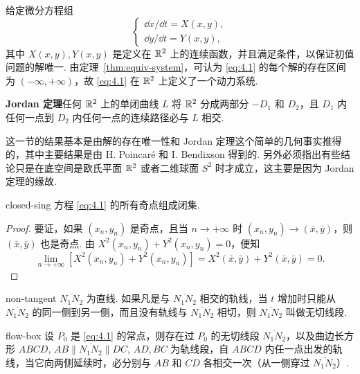 
给定微分方程组
\[
\begin{cases}
\dd x/\dd t = X(x, y), \\
\dd y/\dd t = Y(x, y),
\end{cases} \tag{4.1}\label{eq:4.1}
\]
其中 $X(x, y), Y(x, y)$ 是定义在 $\mathbb{R}^2$ 上的连续函数，并且满足条件，以保证初值问题的解唯一. 由定理~\ref{thm:equiv-system}，可认为 \eqref{eq:4.1} 的每个解的存在区间为 $(-\infty, +\infty)$，故 \eqref{eq:4.1} 在 $\mathbb{R}^2$ 上定义了一个动力系统.

\textbf{Jordan 定理}\quad 任何 $\mathbb{R}^2$ 上的单闭曲线 $L$ 将 $\mathbb{R}^2$ 分成两部分 $-D_1$ 和 $D_2$，且 $D_1$ 内任何一点到 $D_2$ 内任何一点的连续路径必与 $L$ 相交.

这一节的结果基本是由解的存在唯一性和 Jordan 定理这个简单的几何事实推得的，其中主要结果是由 H. Poincaré 和 I. Bendixson 得到的. 另外必须指出有些结论只是在底空间是欧氏平面 $\mathbb{R}^2$ 或者二维球面 $S^2$ 时才成立，这主要是因为 Jordan 定理的缘故.

\begin{theorem}{}{closed-sing}
方程 \eqref{eq:4.1} 的所有奇点组成闭集.
\end{theorem}

\begin{proof}
要证，如果 $(x_n, y_n)$ 是奇点，且当 $n \to +\infty$ 时 $(x_n, y_n) \to (\bar x, \bar y)$，则 $(\bar x, \bar y)$ 也是奇点. 由 $X^2(x_n, y_n) + Y^2(x_n, y_n) = 0$，便知
\[
\lim_{n \to +\infty} \left[X^2(x_n, y_n) + Y^2(x_n, y_n)\right] = X^2(\bar x, \bar y) + Y^2(\bar x, \bar y) = 0.
\]
\end{proof}

\begin{definition}{}{non-tangent}
$\overline{N_1N_2}$ 为直线. 如果凡是与 $\overline{N_1N_2}$ 相交的轨线，当 $t$ 增加时只能从 $\overline{N_1N_2}$ 的同一侧到另一侧，而且没有轨线与 $\overline{N_1N_2}$ 相切，则 $\overline{N_1N_2}$ 叫做无切线段.
\end{definition}

\begin{lemma}{}{flow-box}
设 $P_0$ 是 \eqref{eq:4.1} 的常点，则存在过 $P_0$ 的无切线段 $\overline{N_1N_2}$，以及曲边长方形 $ABCD$, $AB \parallel \overline{N_1N_2} \parallel DC$, $AD, BC$ 为轨线段，自 $ABCD$ 内任一点出发的轨线，当它向两侧延续时，必分别与 $AB$ 和 $CD$ 各相交一次（从一侧穿过 $\overline{N_1N_2}$）.
\end{lemma}

